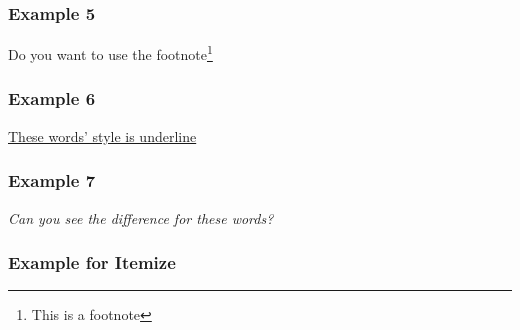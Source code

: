 \documentclass[a4paper,11pt]{article}
\begin{document}
\subsubsection{Example 5}
Do you want to use the footnote\footnote{This is a footnote}
\subsubsection{Example 6}
\underline{These words' style is underline}
\subsubsection{Example 7}
\emph{Can you see the difference for these words?}
\subsubsection{Example for Itemize}
\end{document}
